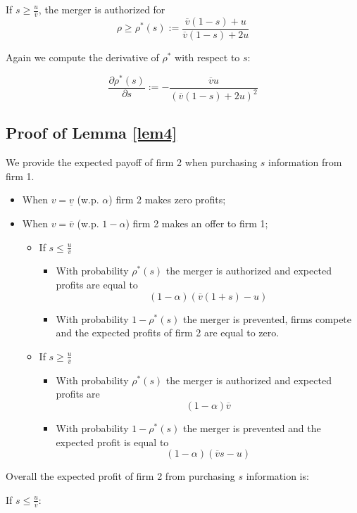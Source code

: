 \documentclass[a4paper,leqno]{article}%
\renewcommand{\a}{\alpha}
\newcommand{\uv}{\underline{v}}
\newcommand{\ov}{\overline{v}}
\begin{document}
If $s\geq \frac{u}{\ov}$, the merger is authorized for 
    \begin{equation}
           \rho\geq \rho^*(s):=\frac{\ov(1-s)+u}{\ov(1-s)+2u}
    \end{equation}

Again we compute the derivative of $\rho^*$ with respect to $s$:

\[
    \frac{\partial \rho^{*}(s)}{\partial s}:=-\frac{\ov u}{(\ov(1-s)+2u)^2}
\]

\subsection{Proof of Lemma \ref{lem4}}\label{lem4p}


We provide the expected payoff of firm 2 when purchasing $s$ information from firm 1.


\begin{itemize}
    \item When $v=\uv$ (w.p. $\a$) firm 2 makes zero profits;
    \item When $v=\ov$ (w.p. $1-\a$) firm 2 makes an offer to firm 1;
    \begin{itemize}
    \item If $s\leq\frac{u}{\ov}$
    \begin{itemize}
        \item With probability $\rho^*(s)$ the merger is authorized and expected profits are equal to $$(1-\a)(\ov(1+s)-u)$$
        \item With probability $1-\rho^*(s)$ the merger is prevented, firms compete and the expected profits of firm 2 are equal to zero.
    \end{itemize}
    \item If $s\geq\frac{u}{\ov}$
    \begin{itemize}
        \item With probability $\rho^*(s)$ the merger is authorized and expected profits are
        $$(1-\a)\ov$$
        \item With probability $1-\rho^*(s)$ the merger is prevented and the expected profit is equal to $$(1-\a)(\ov s-u)$$
    \end{itemize} 
    \end{itemize}
\end{itemize}

Overall the expected profit of firm 2 from purchasing $s$ information is:

If $s\leq\frac{u}{\ov}$:
\end{document}
